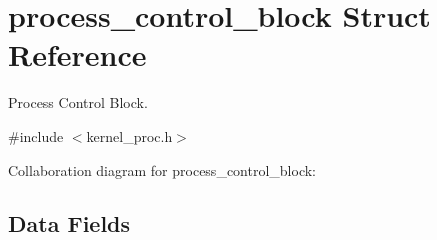 \hypertarget{structprocess__control__block}{}\section{process\+\_\+control\+\_\+block Struct Reference}
\label{structprocess__control__block}


Process Control Block.  




{\ttfamily \#include $<$kernel\+\_\+proc.\+h$>$}



Collaboration diagram for process\+\_\+control\+\_\+block\+:
\subsection*{Data Fields}
